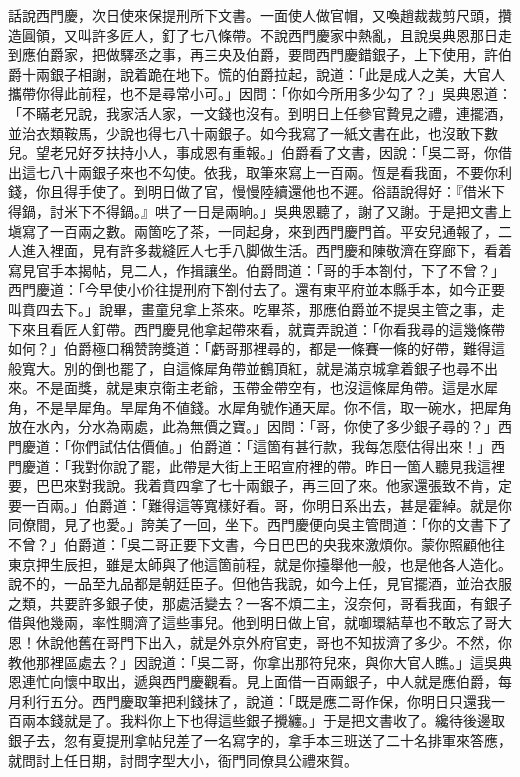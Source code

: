話說西門慶，次日使來保提刑所下文書。一面使人做官帽，又喚趙裁裁剪尺頭，攢造圓領，又叫許多匠人，釘了七八條帶。不說西門慶家中熱亂，且說吳典恩那日走到應伯爵家，把做驛丞之事，再三央及伯爵，要問西門慶錯銀子，上下使用，許伯爵十兩銀子相謝，說着跪在地下。慌的伯爵拉起，說道：「此是成人之美，大官人攜帶你得此前程，也不是尋常小可。」因問：「你如今所用多少勾了？」吳典恩道：「不瞞老兄說，我家活人家，一文錢也沒有。到明日上任參官贄見之禮，連擺酒，並治衣類鞍馬，少說也得七八十兩銀子。如今我寫了一紙文書在此，也沒敢下數兒。望老兄好歹扶持小人，事成恩有重報。」伯爵看了文書，因說：「吳二哥，你借出這七八十兩銀子來也不勾使。依我，取筆來寫上一百兩。恆是看我面，不要你利錢，你且得手使了。到明日做了官，慢慢陸續還他也不遲。俗語說得好：『借米下得鍋，討米下不得鍋。』哄了一日是兩晌。」{}吳典恩聽了，謝了又謝。于是把文書上塡寫了一百兩之數。兩箇吃了茶，一同起身，來到西門慶門首。平安兒通報了，二人進入裡面，見有許多裁縫匠人七手八脚做生活。西門慶和陳敬濟在穿廊下，看着寫見官手本揭帖，見二人，作揖讓坐。伯爵問道：「哥的手本劄付，下了不曾？」西門慶道：「今早使小价往提刑府下劄付去了。還有東平府並本縣手本，如今正要叫賁四去下。」說畢，畫童兒拿上茶來。吃畢茶，那應伯爵並不提吳主管之事，{}走下來且看匠人釘帶。西門慶見他拿起帶來看，就賣弄說道：「你看我尋的這幾條帶如何？」伯爵極口稱赞誇獎道：「虧哥那裡尋的，都是一條賽一條的好帶，難得這般寬大。別的倒也罷了，自這條犀角帶並鶴頂紅，就是滿京城拿着銀子也尋不出來。不是面獎，就是東京衛主老爺，玉帶金帶空有，也沒這條犀角帶。這是水犀角，不是旱犀角。旱犀角不値錢。水犀角號作通天犀。你不信，取一碗水，把犀角放在水內，分水為兩處，此為無價之寶。」{}因問：「哥，你使了多少銀子尋的？」西門慶道：「你們試估估價値。」伯爵道：「這箇有甚行款，我每怎麼估得出來！」西門慶道：「我對你說了罷，此帶是大街上王昭宣府裡的帶。昨日一箇人聽見我這裡要，巴巴來對我說。我着賁四拿了七十兩銀子，再三回了來。他家還張致不肯，定要一百兩。」伯爵道：「難得這等寬樣好看。哥，你明日系出去，甚是霍綽。就是你同僚間，見了也愛。」誇美了一回，坐下。西門慶便向吳主管問道：「你的文書下了不曾？」{}伯爵道：「吳二哥正要下文書，今日巴巴的央我來激煩你。蒙你照顧他往東京押生辰担，雖是太師與了他這箇前程，就是你擡舉他一般，也是他各人造化。說不的，一品至九品都是朝廷臣子。但他告我說，如今上任，見官擺酒，並治衣服之類，共要許多銀子使，那處活變去？一客不煩二主，沒奈何，哥看我面，{}有銀子借與他幾兩，率性賙濟了這些事兒。他到明日做上官，就啣環結草也不敢忘了哥大恩！休說他舊在哥門下出入，就是外京外府官吏，哥也不知拔濟了多少。不然，你教他那裡區處去？」{}因說道：「吳二哥，你拿出那符兒來，{}與你大官人瞧。」這吳典恩連忙向懷中取出，遞與西門慶觀看。見上面借一百兩銀子，中人就是應伯爵，每月利行五分。西門慶取筆把利錢抹了，說道：「既是應二哥作保，你明日只還我一百兩本錢就是了。我料你上下也得這些銀子攪纏。」于是把文書收了。纔待後邊取銀子去，忽有夏提刑拿帖兒差了一名寫字的，拿手本三班送了二十名排軍來答應，{}就問討上任日期，討問字型大小，衙門同僚具公禮來賀。